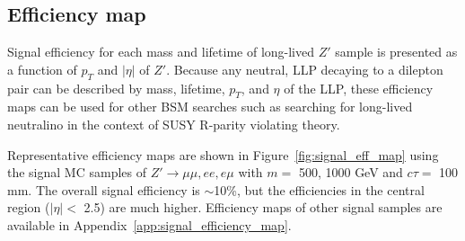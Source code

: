 \subsection{Efficiency map}
\label{sec:efficiency_map}
Signal efficiency for each mass and lifetime of long-lived $Z'$ sample is presented as a function of $p_{T}$ and $|\eta|$ of $Z'$. Because any neutral, LLP decaying to a dilepton pair can be described by mass, lifetime, $p_{T}$, and $\eta$ of the LLP, these efficiency maps can be used for other BSM searches such as searching for long-lived neutralino in the context of SUSY R-parity violating theory.

Representative efficiency maps are shown in Figure~\ref{fig:signal_eff_map} using the signal MC samples of $Z' \rightarrow \mu\mu, ee, e\mu$ with $m=$ 500, 1000 GeV and $c\tau=$ 100 mm. The overall signal efficiency is $\sim$10\%, but the efficiencies in the central region ($|\eta| < $ 2.5) are much higher. Efficiency maps of other signal samples are available in Appendix~\ref{app:signal_efficiency_map}.


